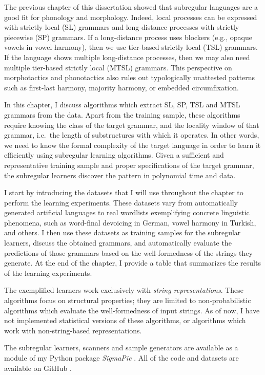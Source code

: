 The previous chapter of this dissertation showed that subregular languages are a good fit for phonology and morphology.
Indeed, local processes can be expressed with strictly local (SL) grammars and long-distance processes with strictly piecewise (SP) grammars.
If a long-distance process uses blockers (e.g., opaque vowels in vowel harmony), then we use tier-based strictly local (TSL) grammars.
If the language shows multiple long-distance processes, then we may also need  multiple tier-based strictly local (MTSL) grammars.
This perspective on morphotactics and phonotactics also rules out typologically unattested patterns such as first-last harmony, majority harmony, or embedded circumfixation.

In this chapter, I discuss algorithms which extract SL, SP, TSL and MTSL grammars from the data.
Apart from the training sample, these algorithms require knowing the class of the target grammar, and the locality window of that grammar, i.e.\ the length of substructures with which it operates.
In other words, we need to know the formal complexity of the target language in order to learn it efficiently using subregular learning algorithms.
Given a sufficient and representative training sample and proper specifications of the target grammar, the subregular learners discover the pattern in polynomial time and data.

I start by introducing the datasets that I will use throughout the chapter to perform the learning experiments.
These datasets vary from automatically generated artificial languages to real wordlists exemplifying concrete linguistic phenomena, such as word-final devoicing in German, vowel harmony in Turkish, and others.
I then use these datasets as training samples for the subregular learners, discuss the obtained grammars, and automatically evaluate the predictions of those grammars based on the well-formedness of the strings they generate.
At the end of the chapter, I provide a table that summarizes the results of the learning experiments.

The exemplified learners work exclusively with \emph{string representations}.
These algorithms focus on structural properties; they are limited to non-probabilistic algorithms which evaluate the well-formedness of input strings.
As of now, I have not implemented statistical versions of these algorithms, or algorithms which work with non-string-based representations.


The subregular learners, scanners and sample generators are available as a module of my Python package \emph{SigmaPie} \href{https://pypi.org/project/SigmaPie/}{\faCube} \citep{sigmapie}.
All of the code and datasets are available on GitHub \href{https://github.com/alenaks/subregular-experiments}{\faGithub} \citep{GHsubex}.


